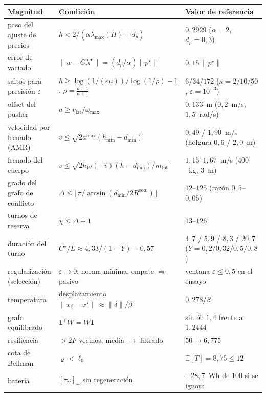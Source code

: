 \begin{center}\small
\begin{tabular}{@{}lll@{}}
\toprule
Magnitud & Condición & Valor de referencia \\
\midrule
paso del ajuste de precios & $h<2/(\alpha\lambda_{\max}(H)+d_p)$ & $0{,}2929$ ($\alpha=2$, $d_p=0{,}3$) \\
error de vaciado & $\lVert w-G\lambda^\star\rVert=(d_p/\alpha)\lVert p^\star\rVert$ & $0{,}15\,\lVert p^\star\rVert$ \\
saltos para precisión $\varepsilon$ & $h\ge\log(1/(\varepsilon\mu))/\log(1/\rho)-1$, $\rho=\tfrac{\kappa-1}{\kappa+1}$ & $6/34/172$ ($\kappa=2/10/50$, $\varepsilon=10^{-3}$) \\
offset del pusher & $a\ge v_{\mathrm{lat}}/\omega_{\max}$ & $0{,}133$~m ($0{,}2$~m/s, $1{,}5$~rad/s) \\
velocidad por frenado (AMR) & $v\le\sqrt{2a^{\max}(h_{\min}-d_{\min})}$ & $0{,}49$ / $1{,}90$~m/s (holgura $0{,}6$ / $2{,}0$~m) \\
frenado del cuerpo & $v\le\sqrt{2h_{\mathcal W}(-\hat v)(h-d_{\min})/m_{\mathrm{tot}}}$ & $1{,}15$–$1{,}67$~m/s ($400$~kg, $3$~m) \\
grado del grafo de conflicto & $\Delta\le\lfloor\pi/\arcsin(d_{\min}/2R^{\mathrm{com}})\rfloor$ & $12$–$125$ (razón $0{,}5$–$0{,}05$) \\
turnos de reserva & $\chi\le\Delta+1$ & $13$–$126$ \\
duración del turno & $C^\star/L\approx4{,}33/(1-Y)-0{,}57$ & $4{,}7$ / $5{,}9$ / $8{,}3$ / $20{,}7$ ($Y=0{,}2/0{,}32/0{,}5/0{,}8$) \\
regularización (selección) & $\varepsilon\to0$: norma mínima; empate $\Rightarrow$ pasivo & ventana $\varepsilon\le0{,}5$ en el ensayo \\
temperatura & desplazamiento $\lVert x_\beta-x^\star\rVert\approx\lVert\delta\rVert/\beta$ & $0{,}278/\beta$ \\
grafo equilibrado & $\mathbf 1^{\!\top}W=W\mathbf 1$ & sin él: $1{,}4$ frente a $1{,}2444$ \\
resiliencia & $>2F$ vecinos; media $\to$ filtrado & $50\to6{,}775$ \\
cota de Bellman & $\varrho<\ell_0$ & $\mathbb E[T]=8{,}75\le12$ \\
batería & $[\tau\omega]_+$ sin regeneración & $+28{,}7$~Wh de $100$ si se ignora \\
\bottomrule
\end{tabular}
\end{center}

